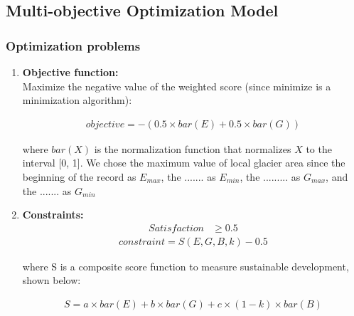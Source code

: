 \documentclass[UTF8]{mcmthesis}
\begin{document}
        \subsection{Multi-objective Optimization Model}
        \subsubsection{Optimization problems}
        \begin{enumerate}
            \item \textbf{Objective function:} \\
            \hspace*{2em}Maximize the negative value of the weighted score (since minimize is a minimization algorithm):

            \begin{equation}
                \begin{aligned}
        objective = - (0.5\times bar(E)+0.5\times bar(G))
                \end{aligned}
                \end{equation}

                where $bar(X)$ is the normalization function that normalizes $X$ to the interval [0, 1]. We chose the maximum value of local glacier area since the beginning of the record as ${E_{max}}$, the ....... as ${E_{min}}$, the ......... as ${G_{max}}$, and the ....... as ${G_{min}}$

            \item \textbf{Constraints:} \\
            \begin{align*}
                Satisfaction & \geq 0.5 
            \end{align*}
            \begin{equation}
                \begin{aligned}
        constraint=S(E,G,B,k)-0.5
                \end{aligned}
                \end{equation}

                where S is a composite score function to measure sustainable development, shown below:

                \begin{equation}
                    \begin{aligned}
            S=a\times bar(E)+b\times bar(G)+c\times (1-k)\times bar(B)
                    \end{aligned}
                    \end{equation}


\end{enumerate}
\end{document}
